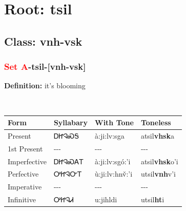 \needspace{4in}
\section*{Root: tsil}
\nopagebreak
{}
\needspace{3in}
\subsection*{Class: vnh-vsk}
\nopagebreak
\needspace{2in}
\subsubsection*{\textcolor{Red}{Set A}{-}\textbf{tsil}{-}[vnh-vsk]}
\nopagebreak
\textbf{Definition: } it{\textquoteright}s blooming
\\[0.5em]
\begin{tabularx}{\textwidth}{l X X X}%
\toprule%
\textbf{Form}&\textbf{Syllabary}&\textbf{With Tone}&\textbf{Toneless}\\%
\midrule%
Present&ᎠᏥᎸᏍᎦ&à:ji:lv:sga&atsil\textbf{vhsk}a\\%
1st Present&{-}{-}{-}&{-}{-}{-}&{-}{-}{-}\\%
Imperfective&ᎠᏥᎸᏍᎪᎢ&à:ji:lv:sgó:’i&atsil\textbf{vhsk}o'i\\%
Perfective&ᎤᏥᎸᏅᎢ&ù:ji:lv:hnv̌:’i&utsil\textbf{vnh}v'i\\%
Imperative&{-}{-}{-}&{-}{-}{-}&{-}{-}{-}\\%
Infinitive&ᎤᏥᎸᏗ&u:jihldi&utsil\textbf{ht}i\\%
\bottomrule%
\end{tabularx}
\\[1em]